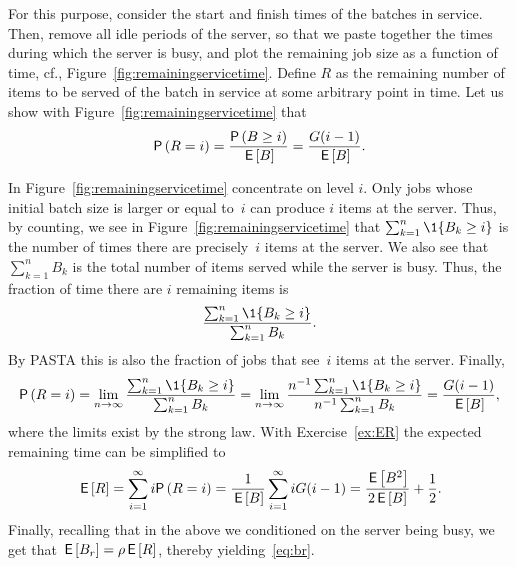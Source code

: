 For this purpose, consider  the start and finish times of the batches in service.  Then, remove all idle periods of the server, so that we paste together the times during which the server is busy, and plot the remaining job size as a function of time, 
cf., Figure~\ref{fig:remainingservicetime}.  Define $R$ as the
remaining number of items to be served of the batch in service at some
arbitrary point in time. Let us show with Figure~\ref{fig:remainingservicetime} that
\begin{equation*}
  \P{R=i} =\frac{\P{B\geq i}}{\E B} = \frac{G(i-1)}{\E B}.
\end{equation*}

In Figure~\ref{fig:remainingservicetime} concentrate on level
$i$. Only jobs whose initial batch size is larger or equal to~$i$ can
produce  $i$ items at the server.
Thus, by counting, we see in Figure~\ref{fig:remainingservicetime}
that $\sum_{k=1}^n \1{B_k \geq i}$ is the number of times there are
precisely~$i$  items at the server.  We also see that $\sum_{k=1}^n B_k$ is
the total number of items served while the server is busy. Thus, the fraction of time there
are $i$ remaining items is
\begin{equation*}
  \frac{\sum_{k=1}^n \1{B_k \geq i}}{\sum_{k=1}^n B_k}.
\end{equation*}
By PASTA this is also the fraction of jobs that see~$i$ items at the server.  Finally, 
\begin{equation*}
\P{R=i} = \lim_{n\to\infty} \frac{\sum_{k=1}^n \1{B_k \geq i}}{\sum_{k=1}^n B_k} 
= \lim_{n\to\infty}  \frac{n^{-1}\sum_{k=1}^n \1{B_k \geq i}}{n^{-1}\sum_{k=1}^n B_k} = \frac{G(i-1)}{\E B},
\end{equation*}
where  the limits exist by the strong law. With  Exercise~\ref{ex:ER} 
the expected remaining time can be simplified to
\begin{equation*}
  \E{R} 
= \sum_{i=1}^\infty i \P{R=i} = \frac1{\E B}\sum_{i=1}^\infty i G(i-1) 
= \frac{\E{B^2}}{2\E B} + \frac{1}2.
\end{equation*}
Finally, recalling that in the above we conditioned on the server
being busy, we get that $\,\mathsf{E}\left[B_r\right] = \rho \,\mathsf{E}\left[R\right]$, thereby yielding~\eqref{eq:br}.

